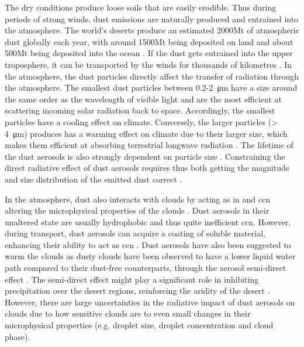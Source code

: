 The dry conditions produce loose soils that are easily erodible. Thus during periods of strong winds, dust emissions are naturally produced and entrained into the atmosphere. 
The world's deserts produce an estimated 2000Mt of atmospheric dust globally each year, with around 1500Mt being deposited on land and about 500Mt being deposited into the ocean \parencite{shao2011dust}. 
If the dust gets entrained into the upper troposphere, it can be transported by the winds for thousands of kilometres \parencite{yumimoto_elevated_2009}. In the atmosphere, the dust particles directly affect the transfer of radiation through the atmosphere. 
The smallest dust particles between 0.2-\SI{2}{\micro\metre} have a size around the same order as the wavelength of visible light and are the most efficient at scattering incoming solar radiation back to space. Accordingly, the smallest particles have a cooling effect on climate. Conversely, the larger particles (> \SI{4}{\micro\metre}) produces has a warming effect on climate due to their larger size, which makes them efficient at absorbing terrestrial longwave radiation \parencite{choobari2014global}.
The lifetime of the dust aerosols is also strongly dependent on particle size \parencite{mahowald2014size}. Constraining the direct radiative effect of dust aerosols requires thus both getting the magnitude and size distribution of the emitted dust correct \parencite{adebiyi2020dust}.

In the atmosphere, dust also interacts with clouds by acting as \acrfull{in} and \acrfull{ccn} altering the microphysical properties of the clouds \parencite{lohmann2006sensitivity}. Dust aerosols in their unaltered state are usually hydrophobic and thus quite inefficient \acrshort{ccn}. However, during transport, dust aerosols can acquire a coating of soluble material, enhancing their ability to act as \acrshort{ccn} \parencite{Dust_aerosols_coating2001}. Dust aerosols have also been suggested to warm the clouds as dusty clouds have been observed to have a lower liquid water path compared to their dust-free counterparts, through the aerosol semi-direct effect \parencite{huang2006satellite}. The semi-direct effect might play a significant role in inhibiting precipitation over the desert regions, reinforcing the aridity of the desert \parencite{shao2011dust}.  However, there are large uncertainties in the radiative impact of dust aerosols on clouds due to how sensitive clouds are to even small changes in their microphysical properties (e.g. droplet size, droplet concentration and cloud phase).

